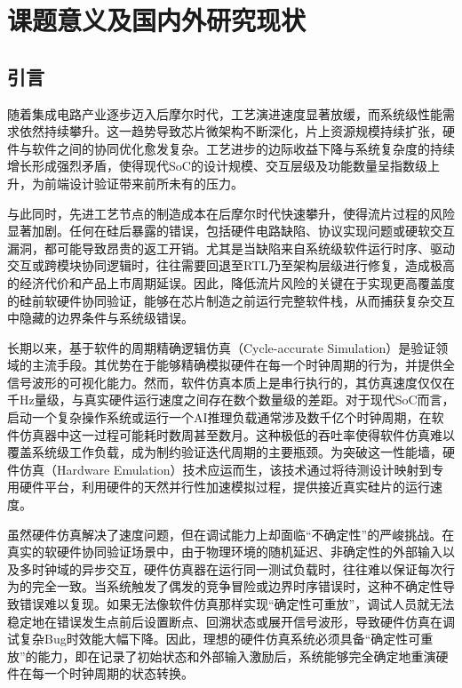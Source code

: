 \chapter{课题意义及国内外研究现状}

\section{引言}

随着集成电路产业逐步迈入后摩尔时代，工艺演进速度显著放缓，而系统级性能需求依然持续攀升。这一趋势导致芯片微架构不断深化，片上资源规模持续扩张，硬件与软件之间的协同优化愈发复杂。工艺进步的边际收益下降与系统复杂度的持续增长形成强烈矛盾，使得现代SoC的设计规模、交互层级及功能数量呈指数级上升，为前端设计验证带来前所未有的压力\cite{esmaeilzadeh2011darksilicon}。

与此同时，先进工艺节点的制造成本在后摩尔时代快速攀升，使得流片过程的风险显著加剧。任何在硅后暴露的错误，包括硬件电路缺陷、协议实现问题或硬软交互漏洞，都可能导致昂贵的返工开销\cite{chen_challenges_2017, gurushankar_challenges_2023}。尤其是当缺陷来自系统级软件运行时序、驱动交互或跨模块协同逻辑时，往往需要回退至RTL乃至架构层级进行修复，造成极高的经济代价和产品上市周期延误。因此，降低流片风险的关键在于实现更高覆盖度的硅前软硬件协同验证，能够在芯片制造之前运行完整软件栈，从而捕获复杂交互中隐藏的边界条件与系统级错误。

长期以来，基于软件的周期精确逻辑仿真（Cycle-accurate Simulation）是验证领域的主流手段。其优势在于能够精确模拟硬件在每一个时钟周期的行为，并提供全信号波形的可视化能力。然而，软件仿真本质上是串行执行的，其仿真速度仅仅在千Hz量级\cite{fujimoto_parallel_1990, nikolic_hardcloud_2019, chung_firesim_2018}，与真实硬件运行速度之间存在数个数量级的差距。对于现代SoC而言，启动一个复杂操作系统或运行一个AI推理负载通常涉及数千亿个时钟周期，在软件仿真器中这一过程可能耗时数周甚至数月。这种极低的吞吐率使得软件仿真难以覆盖系统级工作负载，成为制约验证迭代周期的主要瓶颈。为突破这一性能墙，硬件仿真（Hardware Emulation）技术应运而生，该技术通过将待测设计映射到专用硬件平台，利用硬件的天然并行性加速模拟过程，提供接近真实硅片的运行速度。

虽然硬件仿真解决了速度问题，但在调试能力上却面临“不确定性”的严峻挑战。在真实的软硬件协同验证场景中，由于物理环境的随机延迟、非确定性的外部输入以及多时钟域的异步交互，硬件仿真器在运行同一测试负载时，往往难以保证每次行为的完全一致。当系统触发了偶发的竞争冒险或边界时序错误时，这种不确定性导致错误难以复现。如果无法像软件仿真那样实现“确定性可重放”，调试人员就无法稳定地在错误发生点前后设置断点、回溯状态或展开信号波形，导致硬件仿真在调试复杂Bug时效能大幅下降。因此，理想的硬件仿真系统必须具备“确定性可重放”的能力，即在记录了初始状态和外部输入激励后，系统能够完全确定地重演硬件在每一个时钟周期的状态转换。

